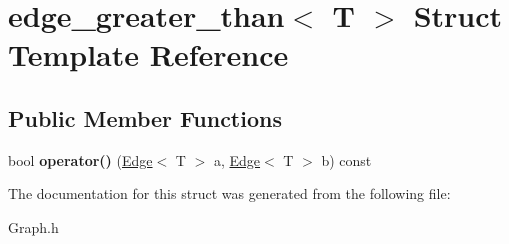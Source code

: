 \hypertarget{structedge__greater__than}{\section{edge\-\_\-greater\-\_\-than$<$ T $>$ Struct Template Reference}
\label{structedge__greater__than}
}
\subsection*{Public Member Functions}
\begin{DoxyCompactItemize}
\item 
\hypertarget{structedge__greater__than_a364f16a857cc5061530aac6c7b02bba4}{bool {\bfseries operator()} (\hyperlink{classEdge}{Edge}$<$ T $>$ a, \hyperlink{classEdge}{Edge}$<$ T $>$ b) const }\label{structedge__greater__than_a364f16a857cc5061530aac6c7b02bba4}

\end{DoxyCompactItemize}


The documentation for this struct was generated from the following file\-:\begin{DoxyCompactItemize}
\item 
Graph.\-h\end{DoxyCompactItemize}
